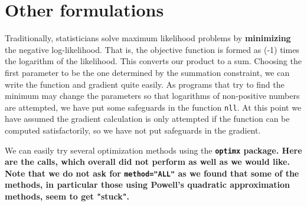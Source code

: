 \documentclass[11pt]{article}
\newcommand{\B}[1]{{\bf #1 \rm}}
\newcommand{\code}[1]{{\tt#1}}
\newcommand{\pkg}[1]{\bf{\tt#1}\rm }
\begin{document}
\section{Other formulations}

Traditionally, statisticians solve maximum likelihood problems by \B{minimizing} the 
negative log-likelihood. That is, the objective function is formed as (-1) times the
logarithm of the likelihood. This converts our product to a sum. Choosing the first
parameter to be the one determined by the summation constraint, we can write the 
function and gradient quite easily. As programs that try to find the minimum may change
the parameters so that logarithms of non-positive numbers are attempted, we have put
some safeguards in the function \code{nll}. At this point we have assumed the gradient
calculation is only attempted if the function can be computed satisfactorily, so we have
not put safeguards in the gradient.

\begin{Schunk}
\end{Schunk}

We can easily try several optimization methods using the \pkg{optimx} package. Here are the
calls, which overall did not perform as well as we would like. Note that we do not ask for
\code{method="ALL"} as we found that some of the methods, in particular those using Powell's
quadratic approximation methods, seem to get "stuck". 
\end{document}
